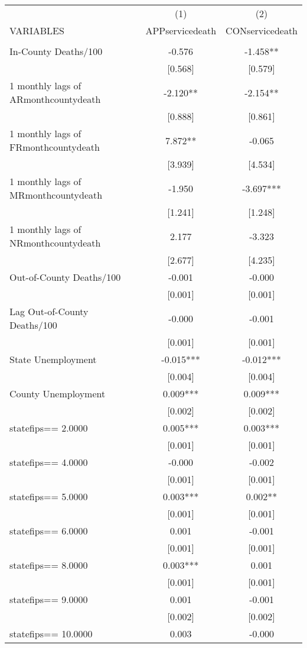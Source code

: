 \documentclass[]{article}
\begin{document}
\begin{tabular}{lcc} \hline
 & (1) & (2) \\
VARIABLES & APPservicedeath & CONservicedeath \\ \hline
 &  &  \\
In-County Deaths/100 & -0.576 & -1.458** \\
 & [0.568] & [0.579] \\
1 monthly lags of ARmonthcountydeath & -2.120** & -2.154** \\
 & [0.888] & [0.861] \\
1 monthly lags of FRmonthcountydeath & 7.872** & -0.065 \\
 & [3.939] & [4.534] \\
1 monthly lags of MRmonthcountydeath & -1.950 & -3.697*** \\
 & [1.241] & [1.248] \\
1 monthly lags of NRmonthcountydeath & 2.177 & -3.323 \\
 & [2.677] & [4.235] \\
Out-of-County Deaths/100 & -0.001 & -0.000 \\
 & [0.001] & [0.001] \\
Lag Out-of-County Deaths/100 & -0.000 & -0.001 \\
 & [0.001] & [0.001] \\
State Unemployment & -0.015*** & -0.012*** \\
 & [0.004] & [0.004] \\
County Unemployment & 0.009*** & 0.009*** \\
 & [0.002] & [0.002] \\
statefips==     2.0000 & 0.005*** & 0.003*** \\
 & [0.001] & [0.001] \\
statefips==     4.0000 & -0.000 & -0.002 \\
 & [0.001] & [0.001] \\
statefips==     5.0000 & 0.003*** & 0.002** \\
 & [0.001] & [0.001] \\
statefips==     6.0000 & 0.001 & -0.001 \\
 & [0.001] & [0.001] \\
statefips==     8.0000 & 0.003*** & 0.001 \\
 & [0.001] & [0.001] \\
statefips==     9.0000 & 0.001 & -0.001 \\
 & [0.002] & [0.002] \\
statefips==    10.0000 & 0.003 & -0.000 \\

\end{tabular}
\end{document}
